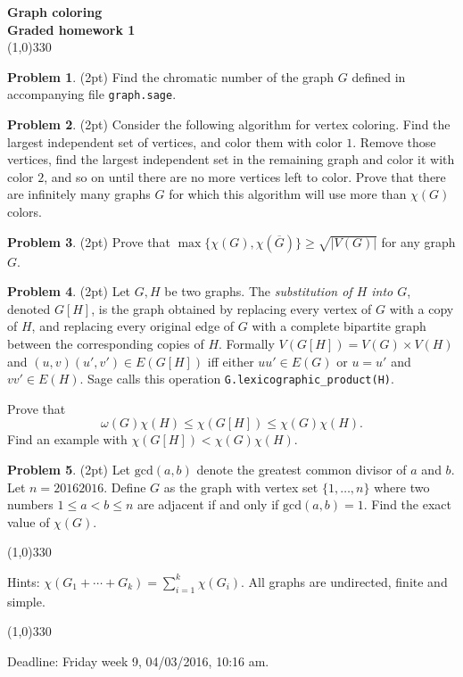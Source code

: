 \documentclass[a4paper]{article}
\theoremstyle{definition}
\newtheorem{myex}{Problem}
\begin{document}
\pagestyle{empty}
\begin{center}
	{\Large\bf Graph coloring}\\
	{\large\bf Graded homework 1}\\
	\line(1,0){330}
\end{center}


\begin{myex}(2pt)
Find the chromatic number of the graph $G$ defined in accompanying file \texttt{graph.sage}. 
\end{myex}

\begin{myex}(2pt)
Consider the following algorithm for vertex coloring. Find the largest independent set of vertices, and color them with color $1$. Remove those vertices, find the largest independent set in the remaining graph and color it with color $2$, and so on until there are no more vertices left to color. Prove that there are infinitely many graphs $G$ for which this algorithm will use more than $\chi(G)$ colors.
\end{myex}

\begin{myex}(2pt) Prove that $\max\{\chi(G),\chi(\overline{G})\}\geq \sqrt{|V(G)|}$ for any graph $G$. 
\end{myex}

\begin{myex}(2pt)
Let $G, H$ be two graphs. The \emph{substitution of $H$ into $G$}, denoted $G[H]$, is the graph obtained by replacing every vertex of $G$ with a copy of $H$, and replacing every original edge of $G$ with a complete bipartite graph between the corresponding copies of $H$. Formally $V(G[H])=V(G)\times V(H)$ and $(u,v)(u',v')\in E(G[H])$ iff either $uu'\in E(G)$ or $u=u'$ and $vv'\in E(H)$. Sage calls this operation \texttt{G.lexicographic\_product(H)}.

\smallskip
\noindent
Prove that
$$\omega(G)\chi(H)\leq \chi(G[H])\leq \chi(G)\chi(H).$$
Find an example with $\chi(G[H])<\chi(G)\chi(H)$.
\end{myex}

\begin{myex}(2pt)
Let $\textrm{gcd}(a,b)$ denote the greatest common divisor of $a$ and $b$. Let $n=20162016$. Define $G$ as the graph with vertex set $\{1,\ldots,n\}$ where two numbers $1\leq a<b\leq n$ are adjacent if and only if $\textrm{gcd}(a,b)=1$. Find the exact value of $\chi(G)$.
\end{myex}

\begin{center}
	\line(1,0){330}
\end{center}
Hints: $\chi(G_1+\cdots+G_k)=\sum_{i=1}^k\chi(G_i)$. All graphs are undirected, finite and simple.
\begin{center}
	\line(1,0){330}
\end{center}
Deadline: Friday week 9, 04/03/2016, 10:16 am.
\end{document}
